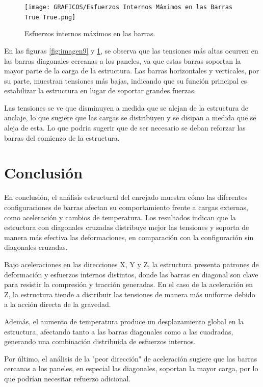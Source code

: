 \begin{figure}[H]
    \centering
    \texttt{[image: GRAFICOS/Esfuerzos Internos Máximos en las Barras True True.png]}
    \caption{Esfuerzos internos máximos en las barras.}
    \label{fig:imagen99}
\end{figure}

En las figuras \ref{fig:imagen9} y \ref{fig:imagen99}, se observa que las tensiones más altas ocurren en las barras diagonales cercanas a los paneles, ya que estas barras soportan la mayor parte de la carga de la estructura. Las barras horizontales y verticales, por su parte, muestran tensiones más bajas, indicando que su función principal es estabilizar la estructura en lugar de soportar grandes fuerzas.

Las tensiones se ve que disminuyen a medida que se alejan de la estructura de anclaje, lo que sugiere que las cargas se distribuyen y se disipan a medida que se aleja de esta. Lo que podria sugerir que de ser necesario se deban reforzar las barras del comienzo de la estructura.
\newpage
\section{Conclusión}

En conclusión, el análisis estructural del enrejado muestra cómo las diferentes configuraciones de barras afectan su comportamiento frente a cargas externas, como aceleración y cambios de temperatura. Los resultados indican que la estructura con diagonales cruzadas distribuye mejor las tensiones y soporta de manera más efectiva las deformaciones, en comparación con la configuración sin diagonales cruzadas.

Bajo aceleraciones en las direcciones X, Y y Z, la estructura presenta patrones de deformación y esfuerzos internos distintos, donde las barras en diagonal son clave para resistir la compresión y tracción generadas. En el caso de la aceleración en Z, la estructura tiende a distribuir las tensiones de manera más uniforme debido a la acción directa de la gravedad.

Además, el aumento de temperatura produce un desplazamiento global en la estructura, afectando tanto a las barras diagonales como a las cuadradas, generando una combinación distribuida de esfuerzos internos.

Por último, el análisis de la "peor dirección" de aceleración sugiere que las barras cercanas a los paneles, en especial las diagonales, soportan la mayor carga, por lo que podrían necesitar refuerzo adicional.